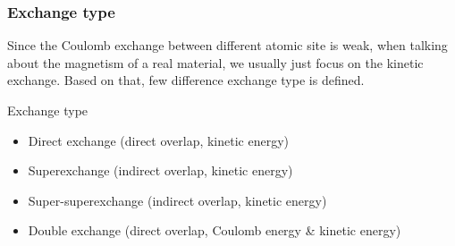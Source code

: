 \documentclass{beamer}
\begin{document}
  \begin{frame}
    \frametitle{Exchange type}
    Since the Coulomb exchange between different atomic site is weak, when talking about the magnetism of a real material, we usually just focus on the kinetic exchange. Based on that, few difference exchange type is defined.
    \begin{block}{Exchange type}
      \begin{itemize}
        \item Direct exchange (direct overlap, kinetic energy)
        \item Superexchange (indirect overlap, kinetic energy)
        \item Super-superexchange (indirect overlap, kinetic energy)
        \item Double exchange (direct overlap, Coulomb energy \& kinetic energy)
      \end{itemize}
    \end{block}
  \end{frame}
\end{document}
